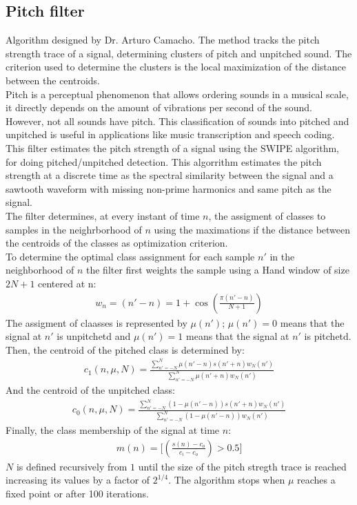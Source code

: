 \documentclass[letterpaper]{article}
\begin{document}
\subsection{Pitch filter}
Algorithm designed by Dr. Arturo Camacho. The method tracks the pitch strength trace of a signal, determining clusters of pitch and unpitched sound. The criterion used to determine the clusters is the local maximization of the distance between the centroids. \\
Pitch is a perceptual phenomenon that allows ordering sounds in a musical scale, it directly depends on the amount of vibrations per second of the sound. However, not all sounds have pitch. This classification of sounds into pitched and unpitched is useful in applications like music transcription and speech coding.\\
This filter estimates the pitch strength of a signal using the SWIPE algorithm, for doing pitched/unpitched detection. This algorrithm estimates the pitch strength at a discrete time as the spectral similarity between the signal and a sawtooth waveform with missing non-prime harmonics and same pitch as the signal.\\
The filter determines, at every instant of time $n$, the assigment of classes to samples in the neighrborhood of $n$ using the maximations if the distance between the centroids of the classes as optimization criterion.\\
To determine the optimal class assignment for each sample $n'$ in the neighborhood of $n$ the filter first weights the sample using a Hand window of size $2N+1$ centered at n:
\begin{align}
w_n=(n'-n)=1+\cos\left(\frac{\pi(n'-n)}{N+1}\right)
\end{align}
The assigment of claasses is represented by $\mu(n')$; $\mu(n')=0$ means that the signal at $n'$ is unpitchetd and $\mu(n')=1$ means that the signal at $n'$ is pitchetd.\\
Then, the centroid of the pitched class is determined by:
\begin{align}
c_1(n,\mu,N)=\frac{\sum_{n'=-N}^N \mu(n'-n)s(n'+n)w_N(n')}{\sum_{n'=-N}^N \mu(n'+n)w_N(n')}
\end{align}
And the centroid of the unpitched class:
\begin{align}
c_0(n,\mu,N)=\frac{\sum_{n'=-N}^N (1-\mu(n'-n))s(n'+n)w_N(n')}{\sum_{n'=-N}^N (1-\mu(n'-n)) w_N(n')}
\end{align}
Finally, the class membership of the signal at time $n$:
\begin{align}
m(n)=\Big [ \left(\frac{s(n)-c_o}{c_i-c_o}\right)>0.5 \Big ]
\end{align}
$N$ is defined recursively from $1$ until the size of the pitch stregth trace is reached increasing  its values by  a factor of $2^{1/4}$. The algorithm stops when $\mu$ reaches a fixed point or  after 100 iterations.
\end{document}
